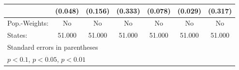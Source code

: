 {\begin{tabular}{l*{6}{c}}
            &     (0.048)         &     (0.156)         &     (0.333)         &     (0.078)         &     (0.029)         &     (0.317)         \\
\hline
Pop.-Weights:&          No         &          No         &          No         &          No         &          No         &          No         \\
States:     &      51.000         &      51.000         &      51.000         &      51.000         &      51.000         &      51.000         \\
\hline\hline
\multicolumn{7}{l}{\footnotesize Standard errors in parentheses}\\
\multicolumn{7}{l}{\footnotesize \sym{*} \(p<0.1\), \sym{**} \(p<0.05\), \sym{***} \(p<0.01\)}\\
\end{tabular}
}
